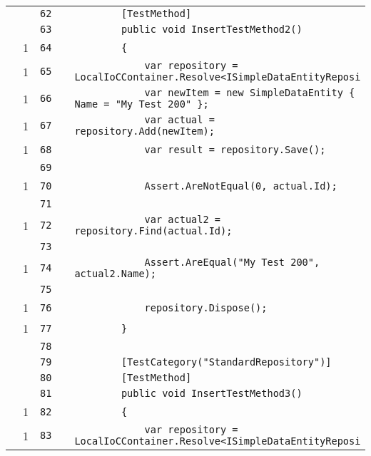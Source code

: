 \documentclass[a4paper,10pt]{article}
\begin{document}
\begin{longtable}[l]{lrrll}
\cellcolor{gray} &  & \verb~62~ & & \verb~        [TestMethod]~\\
\cellcolor{gray} &  & \verb~63~ & & \verb~        public void InsertTestMethod2()~\\
\cellcolor{green} & 1 & \verb~64~ & & \verb~        {~\\
\cellcolor{green} & 1 & \verb~65~ & & \verb~            var repository = LocalIoCContainer.Resolve<ISimpleDataEntityReposi~\\
\cellcolor{green} & 1 & \verb~66~ & & \verb~            var newItem = new SimpleDataEntity { Name = "My Test 200" };~\\
\cellcolor{green} & 1 & \verb~67~ & & \verb~            var actual = repository.Add(newItem);~\\
\cellcolor{green} & 1 & \verb~68~ & & \verb~            var result = repository.Save();~\\
\cellcolor{gray} &  & \verb~69~ & & \verb~~\\
\cellcolor{green} & 1 & \verb~70~ & & \verb~            Assert.AreNotEqual(0, actual.Id);~\\
\cellcolor{gray} &  & \verb~71~ & & \verb~~\\
\cellcolor{green} & 1 & \verb~72~ & & \verb~            var actual2 = repository.Find(actual.Id);~\\
\cellcolor{gray} &  & \verb~73~ & & \verb~~\\
\cellcolor{green} & 1 & \verb~74~ & & \verb~            Assert.AreEqual("My Test 200", actual2.Name);~\\
\cellcolor{gray} &  & \verb~75~ & & \verb~~\\
\cellcolor{green} & 1 & \verb~76~ & & \verb~            repository.Dispose();~\\
\cellcolor{green} & 1 & \verb~77~ & & \verb~        }~\\
\cellcolor{gray} &  & \verb~78~ & & \verb~~\\
\cellcolor{gray} &  & \verb~79~ & & \verb~        [TestCategory("StandardRepository")]~\\
\cellcolor{gray} &  & \verb~80~ & & \verb~        [TestMethod]~\\
\cellcolor{gray} &  & \verb~81~ & & \verb~        public void InsertTestMethod3()~\\
\cellcolor{green} & 1 & \verb~82~ & & \verb~        {~\\
\cellcolor{green} & 1 & \verb~83~ & & \verb~            var repository = LocalIoCContainer.Resolve<ISimpleDataEntityReposi~\\

\end{longtable}
\end{document}
